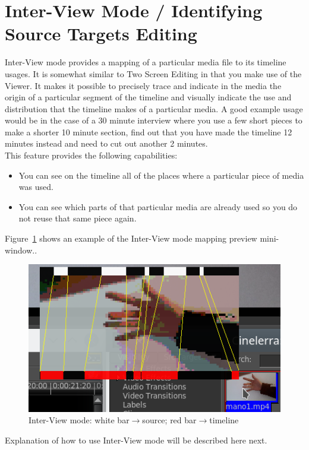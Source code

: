 \section{Inter-View Mode / Identifying Source Targets Editing}%
\label{sec:inter-view_identifying_source_target_editing}

Inter-View mode provides a mapping of a particular media file to its timeline usages. It is somewhat similar to Two Screen Editing in that you make use of the Viewer. It makes it possible to precisely trace and indicate in the media the origin of a particular segment of the timeline and visually indicate the use and distribution that the timeline makes of a particular media.   A good example usage would be in the case of a 30 minute interview where you use a few short pieces to make a shorter 10 minute section, find out that you have made the timeline 12 minutes instead and need to cut out another 2 minutes. \\
This feature provides the following capabilities:
\begin{itemize}
    \item You can see on the timeline all of the places where a particular piece of media was used.
    \item You can see which parts of that particular media are already used so you do not reuse that same 
    piece again.
\end{itemize}
Figure~\ref{fig:inter-view01} shows an example of the Inter-View mode mapping preview mini-window..
\begin{figure}[htpb]
    \centering
    \includegraphics[width=0.8\linewidth]{images/inter-view01.png}
    \caption{Inter-View mode: white bar$\rightarrow$source; red bar$\rightarrow$timeline}
    \label{fig:inter-view01}
\end{figure}

Explanation of how to use Inter-View mode will be described here next.

